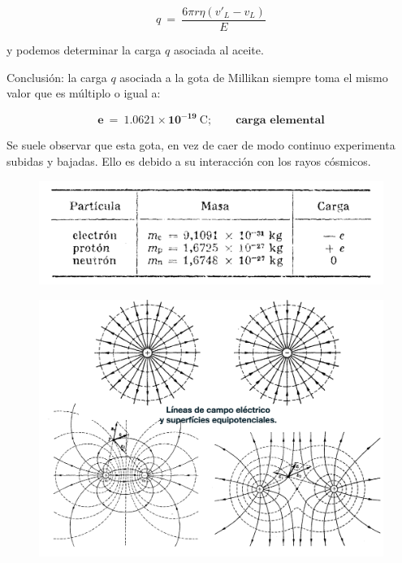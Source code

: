 \begin{equation}
q\ =\ \dfrac{6\pi r \eta (v'_L-v_L)}{E}	
\end{equation}

y podemos determinar la carga $q$ asociada al aceite.

Conclusión: la carga $q$ asociada a la gota de Millikan siempre toma el mismo valor que es múltiplo o igual a:

\begin{equation}
\boldsymbol{e \ = \ 1.0621\times 10^{-19} \ \mathrm{C}};	 \qquad \textbf{carga elemental}
\end{equation}

\textcolor{gris}{Se suele observar que esta gota, en vez de caer de modo continuo experimenta subidas y bajadas. Ello es debido a su interacción con los rayos cósmicos.}

\begin{figure}[H]
	\centering
	\includegraphics[width=1\textwidth]{imagenes/imagenes22/T22IM14.png}
\end{figure}


\begin{figure}[H]
	\centering
	\includegraphics[width=1\textwidth]{imagenes/imagenes22/T22IM13.png}
\end{figure}

